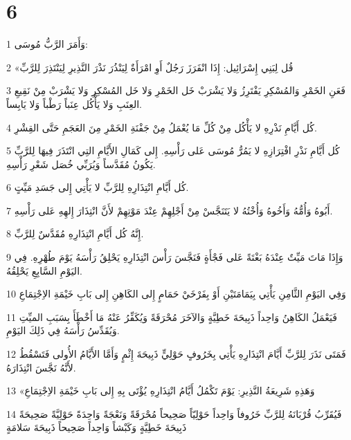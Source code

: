 \chapter{6}

\par 1 وَأَمَرَ الرَّبُّ مُوسَى:
\par 2 «قُل لِبَنِي إِسْرَائِيل: إِذَا انْفَرَزَ رَجُلٌ أَوِ امْرَأَةٌ لِيَنْذُرَ نَذْرَ النَّذِيرِ لِيَنْتَذِرَ لِلرَّبِّ
\par 3 فَعَنِ الخَمْرِ وَالمُسْكِرِ يَفْتَرِزُ وَلا يَشْرَبْ خَل الخَمْرِ وَلا خَل المُسْكِرِ وَلا يَشْرَبْ مِنْ نَقِيعِ العِنَبِ وَلا يَأْكُل عِنَباً رَطْباً وَلا يَابِساً.
\par 4 كُل أَيَّامِ نَذْرِهِ لا يَأْكُل مِنْ كُلِّ مَا يُعْمَلُ مِنْ جَفْنَةِ الخَمْرِ مِنَ العَجَمِ حَتَّى القِشْرِ.
\par 5 كُل أَيَّامِ نَذْرِ افْتِرَازِهِ لا يَمُرُّ مُوسَى عَلى رَأْسِهِ. إِلى كَمَالِ الأَيَّامِ التِي انْتَذَرَ فِيهَا لِلرَّبِّ يَكُونُ مُقَدَّساً وَيُرَبِّي خُصَل شَعْرِ رَأْسِهِ.
\par 6 كُل أَيَّامِ انْتِذَارِهِ لِلرَّبِّ لا يَأْتِي إِلى جَسَدِ مَيِّتٍ.
\par 7 أَبُوهُ وَأُمُّهُ وَأَخُوهُ وَأُخْتُهُ لا يَتَنَجَّسْ مِنْ أَجْلِهِمْ عِنْدَ مَوْتِهِمْ لأَنَّ انْتِذَارَ إِلهِهِ عَلى رَأْسِهِ.
\par 8 إِنَّهُ كُل أَيَّامِ انْتِذَارِهِ مُقَدَّسٌ لِلرَّبِّ.
\par 9 وَإِذَا مَاتَ مَيِّتٌ عِنْدَهُ بَغْتَةً عَلى فَجْأَةٍ فَنَجَّسَ رَأْسَ انْتِذَارِهِ يَحْلِقُ رَأْسَهُ يَوْمَ طُهْرِهِ. فِي اليَوْمِ السَّابِعِ يَحْلِقُهُ.
\par 10 وَفِي اليَوْمِ الثَّامِنِ يَأْتِي بِيَمَامَتَيْنِ أَوْ بِفَرْخَيْ حَمَامٍ إِلى الكَاهِنِ إِلى بَابِ خَيْمَةِ الاِجْتِمَاعِ
\par 11 فَيَعْمَلُ الكَاهِنُ وَاحِداً ذَبِيحَةَ خَطِيَّةٍ وَالآخَرَ مُحْرَقَةً وَيُكَفِّرُ عَنْهُ مَا أَخْطَأَ بِسَبَبِ الميِّتِ وَيُقَدِّسُ رَأْسَهُ فِي ذَلِكَ اليَوْمِ.
\par 12 فَمَتَى نَذَرَ لِلرَّبِّ أَيَّامَ انْتِذَارِهِ يَأْتِي بِخَرُوفٍ حَوْلِيٍّ ذَبِيحَةَ إِثْمٍ وَأَمَّا الأَيَّامُ الأُولى فَتَسْقُطُ لأَنَّهُ نَجَّسَ انْتِذَارَهُ.
\par 13 «وَهَذِهِ شَرِيعَةُ النَّذِيرِ: يَوْمَ تَكْمُلُ أَيَّامُ انْتِذَارِهِ يُؤْتَى بِهِ إِلى بَابِ خَيْمَةِ الاِجْتِمَاعِ
\par 14 فَيُقَرِّبُ قُرْبَانَهُ لِلرَّبِّ خَرُوفاً وَاحِداً حَوْلِيّاً صَحِيحاً مُحْرَقَةً وَنَعْجَةً وَاحِدَةً حَوْلِيَّةً صَحِيحَةً ذَبِيحَةَ خَطِيَّةٍ وَكَبْشاً وَاحِداً صَحِيحاً ذَبِيحَةَ سَلامَةٍ
